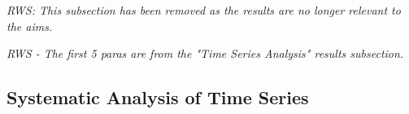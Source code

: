 \documentclass{ametsoc}
\begin{document}

\emph{RWS: This subsection has been removed as the results are no longer relevant to the aims.}

\emph{RWS - The first 5 paras are from the "Time Series Analysis" results subsection.}
\subsection{Systematic Analysis of Time Series}

%
\end{document}
